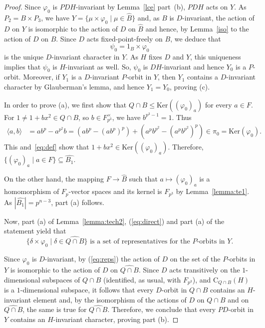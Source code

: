 \documentclass{amsart}
\def\cent#1#2{\mathrm{C}_{{#1}}{{(#2)}}}
\begin{document}
\begin{proof}
Since $\varphi_0$ is $PDH$-invariant by Lemma~\ref{lce} part~(b),  $PDH$ acts on  $Y$.
  As $P_2 = B \times P_3 $, we have   $Y = \{\mu \times \varphi_0 \mid \mu \in \widehat{B} \}$
and, as $B$ is $D$-invariant,  the action of $D$ on $Y$
is  isomorphic to the action of $D$ on $\widehat{B}$ and hence, by Lemma~\ref{iso} to the
action of $D$ on $B$.
Since $D$ acts fixed-point-freely on $B$, we deduce that
$$\psi_0 = 1_B \times \varphi_0$$
is the unique $D$-invariant character in $Y$.  As $H$ fixes $D$ and $Y$, this uniqueness implies that
$\psi_0$ is $H$-invariant as well. So, $\psi_0$ is $DH$-invariant and hence $Y_0$ is a $P$-orbit.
Moreover, if $Y_1$ is a $D$-invariant $P$-orbit in $Y$, then $Y_1$ contains a $D$-invariant character by
Glauberman's lemma, and hence $Y_1 = Y_0$, proving (c).

In order to prove (a), we first show that $Q\cap B\le\mathrm{Ker}((\varphi_0)_a)$ for every $a \in F$.
For $1 \neq 1+b x^2 \in Q \cap B$, so $b\in F_{p^3}^\times$, we have  $b^{p^3-1}=1$. Thus
\begin{align*}
\langle a,b\rangle&=ab^p-a^{p^2}b=(ab^p-(ab^p)^p)+(a^pb^{p^2}-(a^pb^{p^2})^p)\in \pi_0=\mathrm{Ker}(\varphi_0).
\end{align*}
This and~\eqref{eq:def} show that $1+b x^2\in \mathrm{Ker}((\varphi_0)_a)$.
Therefore, $\{(\varphi_0)_a\mid a\in F\} \subseteq \widehat{B_1}$.

On the other hand, the mapping $F\to\widehat{B}$ such that  $a\mapsto (\varphi_0)_a$  is a homomorphism of $F_p$-vector
spaces and its kernel is $F_{p^3}$ by Lemma~\ref{lemma:te1}. As $|\widehat{B_1}| = p^{n-3}$,  part (a) follows.


Now, part (a) of Lemma~\ref{lemma:tech2}, (\ref{eq:direct}) and part (a) of the statement yield that
\begin{equation}
  \label{eq:reps}
  \{\delta \times \varphi_0 \mid \delta \in \widehat{Q \cap B} \}
\text{  is a set of representatives for the $P$-orbits in $Y$.}
\end{equation}


Since $\varphi_0$ is $D$-invariant, by (\ref{eq:reps}) the action of $D$ on the set of  the $P$-orbits in $Y$ is
isomorphic to the action of $D$ on $\widehat{Q \cap B}$.
Since $D$ acts transitively on the $1$-dimensional subspaces of $Q\cap B$ (identified, as usual, with $F_{p^3}$),
and $\cent{Q\cap B}H$ is a $1$-dimensional subspace, it follows that every $D$-orbit in $Q \cap B$ contains an
$H$-invariant element and, by the isomorphism of the actions of $D$ on $Q\cap B$ and on $\widehat{Q \cap B}$, the same is true
for $\widehat{Q \cap B}$.
Therefore, we conclude that every $PD$-orbit in $Y$ contains an $H$-invariant character, proving part (b).


\end{proof}
\end{document}
